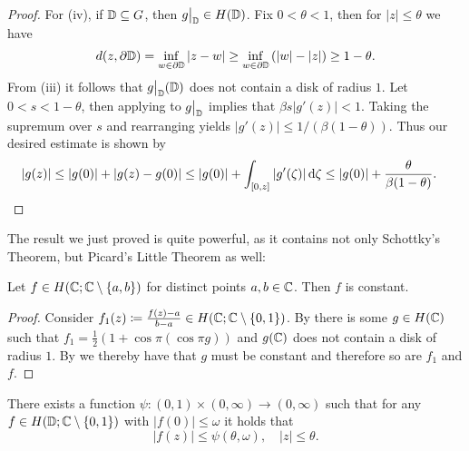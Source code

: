\begin{proof}
    For (iv), if $\mathbb{D} \subseteq G$, then $\restr{g}{\D} \in H(\D)$. Fix $0 < \theta < 1$, then for $\vert z \vert \leq \theta$ we have
    $$ d(z, \partial \mathbb{D}) = \inf_{w \in \partial \mathbb{D}} \vert z - w \vert \geq \inf_{w \in \partial \mathbb{D}} \left( \vert w \vert - \vert z \vert \right) \geq 1 - \theta. $$
    From (iii) it follows that $\restr{g}{\D}(\D)$ does not contain a disk of radius $1$. Let $0 < s < 1 - \theta$, then applying  to $\restr{g}{\D}$ implies that $\beta s \vert g'(z) \vert < 1$. Taking the supremum over $s$ and rearranging yields $ \vert g'(z) \vert \leq 1 / (\beta (1 - \theta))$. Thus our desired estimate is shown by
    \begin{align*}
        \vert g(z) \vert &\leq \vert g(0) \vert + \vert g(z) - g(0) \vert \leq \vert g(0) \vert + \int_{[0, z]} \vert g'(\zeta) \vert \mathop{}\!\mathrm{d} \zeta \leq \vert g(0) \vert + \frac{\theta}{\beta (1 - \theta)}.
    \end{align*}
\end{proof}

The result we just proved is quite powerful, as it contains not only Schottky's Theorem, but Picard's Little Theorem as well:

\begin{theorem} \label{thm:picard-little}
    Let $f \in H(\mathbb{C}; \mathbb{C} \setminus \{ a, b \})$ for distinct points $a, b \in \mathbb{C}$. Then $f$ is constant.
\end{theorem}

\begin{proof}
    Consider $f_1(z) \coloneqq \frac{f(z) - a}{b - a} \in H(\mathbb{C}; \mathbb{C} \setminus \{ 0, 1 \})$. By  there is some $g \in H(\mathbb{C})$ such that $f_1 = \frac{1}{2}(1 + \cos \pi (\cos \pi g))$ and $g(\mathbb{C})$ does not contain a disk of radius $1$. By  we thereby have that $g$ must be constant and therefore so are $f_1$ and $f$.
\end{proof}

\begin{theorem}[Schottky] \label{thm:schottky}
    There exists a function ${\psi : (0, 1) \times (0, \infty) \to (0, \infty)}$ such that for any $f \in H(\mathbb{D}; \mathbb{C} \setminus \{ 0, 1 \})$ with $\vert f(0) \vert \leq \omega$ it holds that
    \begin{equation}
        \vert f(z) \vert \leq \psi(\theta, \omega), \quad \vert z \vert \leq \theta.
    \end{equation}
\end{theorem}

